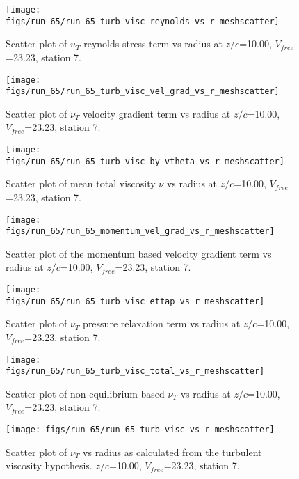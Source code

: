 \begin{figure}[H]
\centering
\texttt{[image: figs/run\_65/run\_65\_turb\_visc\_reynolds\_vs\_r\_meshscatter]}
\caption{Scatter plot of $
u_T$ reynolds stress term vs radius at $z/c$=10.00, $V_{free}$=23.23, station 7.}
\end{figure}


\begin{figure}[H]
\centering
\texttt{[image: figs/run\_65/run\_65\_turb\_visc\_vel\_grad\_vs\_r\_meshscatter]}
\caption{Scatter plot of $\nu_T$ velocity gradient term vs radius at $z/c$=10.00, $V_{free}$=23.23, station 7.}
\end{figure}


\begin{figure}[H]
\centering
\texttt{[image: figs/run\_65/run\_65\_turb\_visc\_by\_vtheta\_vs\_r\_meshscatter]}
\caption{Scatter plot of mean total viscosity $\nu$ vs radius at $z/c$=10.00, $V_{free}$=23.23, station 7.}
\end{figure}


\begin{figure}[H]
\centering
\texttt{[image: figs/run\_65/run\_65\_momentum\_vel\_grad\_vs\_r\_meshscatter]}
\caption{Scatter plot of the momentum based velocity gradient term vs radius at $z/c$=10.00, $V_{free}$=23.23, station 7.}
\end{figure}


\begin{figure}[H]
\centering
\texttt{[image: figs/run\_65/run\_65\_turb\_visc\_ettap\_vs\_r\_meshscatter]}
\caption{Scatter plot of $\nu_T$ pressure relaxation term vs radius at $z/c$=10.00, $V_{free}$=23.23, station 7.}
\end{figure}


\begin{figure}[H]
\centering
\texttt{[image: figs/run\_65/run\_65\_turb\_visc\_total\_vs\_r\_meshscatter]}
\caption{Scatter plot of non-equilibrium based $\nu_T$ vs radius at $z/c$=10.00, $V_{free}$=23.23, station 7.}
\end{figure}


\begin{figure}[H]
\centering
\texttt{[image: figs/run\_65/run\_65\_turb\_visc\_vs\_r\_meshscatter]}
\caption{Scatter plot of $\nu_T$ vs radius as calculated from the turbulent viscosity hypothesis. $z/c$=10.00, $V_{free}$=23.23, station 7.}
\end{figure}


